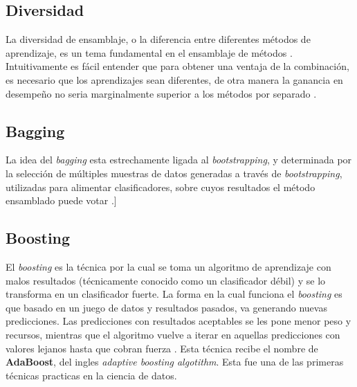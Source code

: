 \documentclass[letterpaper, spanish, 11pt]{report}
\begin{document}
\subsection{Diversidad}
La diversidad de ensamblaje, o la diferencia entre diferentes métodos de aprendizaje, es un tema fundamental en el ensamblaje de métodos \cite{ensembleMethods}. Intuitivamente es fácil entender que para obtener una ventaja de la combinación, es necesario que los aprendizajes sean diferentes, de otra manera la ganancia en desempeño no seria marginalmente superior a los métodos por separado \cite{ensembleMethods}.

\subsection{Bagging}
La idea del \emph{bagging} esta estrechamente ligada al \emph{bootstrapping}, y determinada por la selección de múltiples muestras de datos generadas a través de \emph{bootstrapping}, utilizadas para alimentar clasificadores, sobre cuyos resultados el método ensamblado puede votar \cite{daume}.]

\subsection{Boosting}
El \emph{boosting} es la técnica por la cual se toma un algoritmo de aprendizaje con malos resultados (técnicamente conocido como un clasificador débil) y se lo transforma en un clasificador fuerte. La forma en la cual funciona el \emph{boosting} es que basado en un juego de datos y resultados pasados, va generando nuevas predicciones. Las predicciones con resultados aceptables se les pone menor peso y recursos, mientras que el algoritmo vuelve a iterar en aquellas predicciones con valores lejanos hasta que cobran fuerza \cite{daume}. Esta técnica recibe el nombre de \textbf{AdaBoost}, del ingles \emph{adaptive boosting algotithm}. Esta fue una de las primeras técnicas practicas en la ciencia de datos.


\pagebreak

\end{document}
